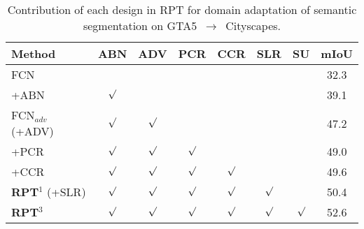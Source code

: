 \documentclass[10pt,twocolumn,letterpaper]{article}
\begin{document}
\begin{table}
      \centering
      \small
      \caption{\small Contribution of each design in RPT for domain adaptation of semantic segmentation on GTA5~$\to$~Cityscapes.}
      \begin{tabular}{l|c@{~}c@{~}c@{~}c@{~}c@{~}c|c} \hline
         \textbf{Method} & \textbf{ABN} & \textbf{ADV} & \textbf{PCR} & \textbf{CCR}  & \textbf{SLR} & \textbf{SU} & \textbf{mIoU} \\\hline
         FCN           &              &              &               &               &          &     & 32.3          \\
         +ABN         & $\surd$      &              &               &               &          &    & 39.1           \\
         FCN$_{adv}$ (+ADV)        & $\surd$      & $\surd$      &               &               &          &    &  47.2          \\ \hline
         +{PCR}         & $\surd$      & $\surd$      & $\surd$       &               &          &    & 49.0          \\
         +{CCR}        & $\surd$      & $\surd$      & $\surd$       & $\surd$       &          &     & 49.6          \\
         \textbf{RPT$^{1}$} (+{SLR})         & $\surd$      & $\surd$      & $\surd$       & $\surd$       & $\surd$  &    &  50.4          \\
         \textbf{RPT$^{3}$}           & $\surd$      & $\surd$      & $\surd$       & $\surd$       & $\surd$  &  $\surd$ &   52.6          \\\hline
      \end{tabular}
      \label{tab:contribution}
   \vspace{-0.15in}
\end{table}
\end{document}
